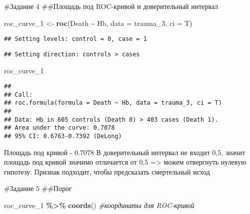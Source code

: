 \documentclass[
]{article}
\newenvironment{Shaded}{\begin{snugshade}}{\end{snugshade}}
\newcommand{\AttributeTok}[1]{\textcolor[rgb]{0.13,0.29,0.53}{#1}}
\newcommand{\CommentTok}[1]{\textcolor[rgb]{0.56,0.35,0.01}{\textit{#1}}}
\newcommand{\FunctionTok}[1]{\textcolor[rgb]{0.13,0.29,0.53}{\textbf{#1}}}
\newcommand{\NormalTok}[1]{#1}
\newcommand{\OtherTok}[1]{\textcolor[rgb]{0.56,0.35,0.01}{#1}}
\newcommand{\SpecialCharTok}[1]{\textcolor[rgb]{0.81,0.36,0.00}{\textbf{#1}}}
\begin{document}
\#Задание 4 \#\#Площадь под ROC-кривой и доверительный интервал

\begin{Shaded}
\begin{Highlighting}[]
\NormalTok{roc\_curve\_1 }\OtherTok{\textless{}{-}} \FunctionTok{roc}\NormalTok{(Death }\SpecialCharTok{\textasciitilde{}}\NormalTok{ Hb, }
                   \AttributeTok{data =}\NormalTok{ trauma\_3,}
                   \AttributeTok{ci =}\NormalTok{ T)}
\end{Highlighting}
\end{Shaded}

\begin{verbatim}
## Setting levels: control = 0, case = 1
\end{verbatim}

\begin{verbatim}
## Setting direction: controls > cases
\end{verbatim}

\begin{Shaded}
\begin{Highlighting}[]
\NormalTok{roc\_curve\_1}
\end{Highlighting}
\end{Shaded}

\begin{verbatim}
## 
## Call:
## roc.formula(formula = Death ~ Hb, data = trauma_3, ci = T)
## 
## Data: Hb in 605 controls (Death 0) > 403 cases (Death 1).
## Area under the curve: 0.7078
## 95% CI: 0.6763-0.7392 (DeLong)
\end{verbatim}

Площадь под кривой - 0.7078 В доверительный интервал не входит 0,5,
значит площадь под кривой значимо отличается от 0,5 =\textgreater{}
можем отвергнуть нулевую гипотезу. Признак подходит, чтобы предсказать
смертельный исход

\#Задание 5 \#\#Порог

\begin{Shaded}
\begin{Highlighting}[]
\NormalTok{roc\_curve\_1 }\SpecialCharTok{\%\textgreater{}\%} \FunctionTok{coords}\NormalTok{() }\CommentTok{\#координаты для ROC{-}кривой}
\end{Highlighting}
\end{Shaded}
\end{document}
